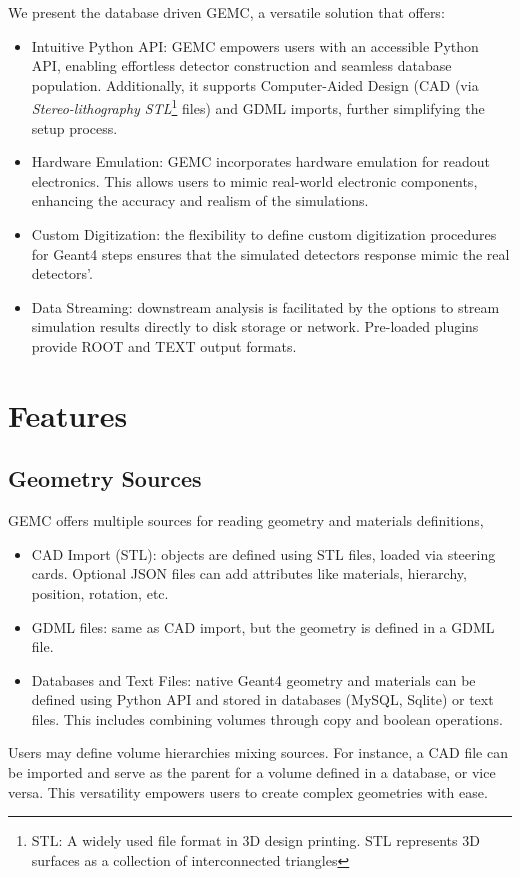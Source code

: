 \newpage
We present the database driven GEMC\cite{clas12_gemc, gemc_homepage}, a versatile solution that offers:

\begin{itemize}
    \item Intuitive Python API: GEMC empowers users with an accessible Python API, enabling
    effortless detector construction and seamless database population.
    Additionally, it supports Computer-Aided Design (CAD (via \emph{Stereo-lithography STL}\footnote{STL: A widely used file format
    in 3D design printing. STL represents 3D surfaces as a collection of
    interconnected triangles} files) and GDML imports, further simplifying the setup process.
    \item Hardware Emulation: GEMC incorporates hardware emulation for readout electronics.
    This allows users to mimic real-world electronic components, enhancing the accuracy and realism of
    the simulations.
    \item Custom Digitization: the flexibility to define custom digitization procedures for Geant4 steps
    ensures that the simulated detectors response mimic the real detectors'.
    \item Data Streaming: downstream analysis is facilitated by the options to stream simulation results directly
    to disk storage or network.
    Pre-loaded plugins provide ROOT and TEXT output formats.
\end{itemize}


\section{Features}
\label{sec:features}

\subsection{Geometry Sources}
\label{subsec:databases}
GEMC offers multiple sources for reading geometry and materials definitions,

\begin{itemize}
    \item CAD Import (STL): objects are defined using STL files, loaded via
    steering cards.
    Optional JSON files can add attributes like materials,
    hierarchy, position, rotation, etc.
    \item GDML files: same as CAD import, but the geometry is defined
    in a GDML file.
    \item Databases and Text Files: native Geant4 geometry and materials can be defined
    using Python API and stored in databases (MySQL, Sqlite) or text files.
    This includes combining volumes through copy and boolean operations.
\end{itemize}
Users may define volume hierarchies mixing sources.
For instance, a CAD file can be imported and serve as the parent for a volume
defined in a database, or vice versa.
This versatility empowers users to create complex geometries with ease.

